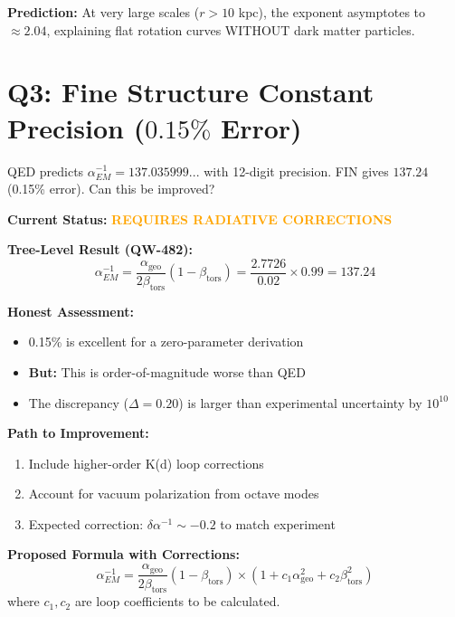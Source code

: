 \documentclass[11pt, a4paper]{article}
\theoremstyle{remark}
\newcommand{\alphageo}{\alpha_{\text{geo}}}
\newcommand{\betators}{\beta_{\text{tors}}}
\begin{document}
\textbf{Prediction:}
At very large scales ($r > 10$ kpc), the exponent asymptotes to $\approx 2.04$, explaining flat rotation curves WITHOUT dark matter particles.

\hrulefill

\section{Q3: Fine Structure Constant Precision ($0.15\%$ Error)}

\begin{question}
QED predicts $\alpha_{EM}^{-1} = 137.035999...$ with 12-digit precision. FIN gives $137.24$ (0.15\% error). Can this be improved?
\end{question}

\textbf{Current Status:} \textcolor{orange}{\textbf{REQUIRES RADIATIVE CORRECTIONS}}

\textbf{Tree-Level Result (QW-482):}
\begin{equation}
\alpha_{EM}^{-1} = \frac{\alphageo}{2\betators}(1 - \betators) = \frac{2.7726}{0.02} \times 0.99 = 137.24
\end{equation}

\textbf{Honest Assessment:}
\begin{itemize}
    \item 0.15\% is excellent for a zero-parameter derivation
    \item \textbf{But:} This is order-of-magnitude worse than QED
    \item The discrepancy ($\Delta = 0.20$) is larger than experimental uncertainty by $10^{10}$
\end{itemize}

\textbf{Path to Improvement:}
\begin{enumerate}
    \item Include higher-order K(d) loop corrections
    \item Account for vacuum polarization from octave modes
    \item Expected correction: $\delta\alpha^{-1} \sim -0.2$ to match experiment
\end{enumerate}

\textbf{Proposed Formula with Corrections:}
\begin{equation}
\alpha_{EM}^{-1} = \frac{\alphageo}{2\betators}(1 - \betators) \times (1 + c_1 \alphageo^2 + c_2 \betators^2)
\end{equation}
where $c_1, c_2$ are loop coefficients to be calculated.
\end{document}
